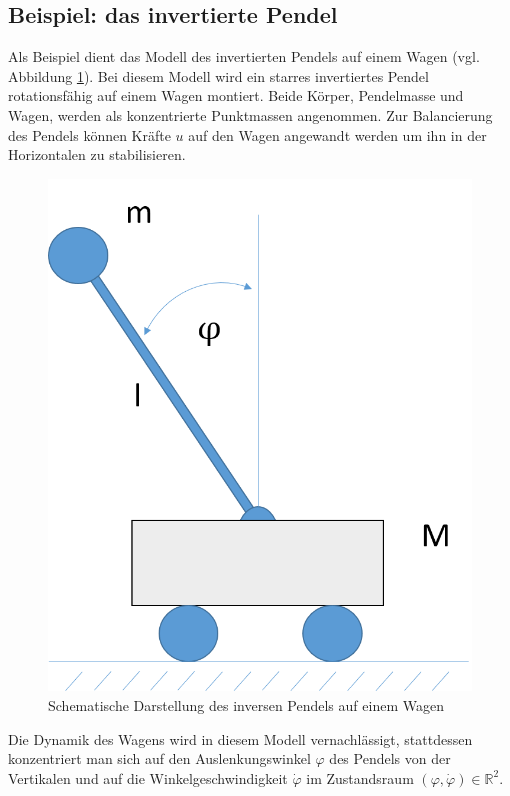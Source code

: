 \documentclass[12pt,a4paper,twoside]{article}
\begin{document}
	\subsection{Beispiel: das invertierte Pendel}
	
	Als Beispiel dient das Modell des invertierten Pendels auf einem Wagen (vgl. Abbildung \ref{pic:inv_pend}). Bei diesem Modell wird ein starres 
	invertiertes Pendel rotationsfähig auf einem Wagen montiert. Beide Körper, Pendelmasse und Wagen, werden als 
	konzentrierte Punktmassen angenommen. Zur Balancierung des Pendels können Kräfte $u$ auf den Wagen angewandt 
	werden um ihn in der Horizontalen zu stabilisieren.
	\begin{figure}[h]
	\center
		\includegraphics[scale=0.4]{inverted_pendulum}
		\caption{\label{pic:inv_pend}Schematische Darstellung des inversen Pendels auf einem Wagen}
	\end{figure}
	 Die Dynamik des Wagens wird in diesem Modell vernachlässigt, 
	stattdessen konzentriert man sich auf den Auslenkungswinkel $\varphi$ des Pendels von der Vertikalen und auf die 
	Winkelgeschwindigkeit $\dot{\varphi}$ im Zustandsraum $(\varphi,\dot{\varphi})\in \mathds{R}^2$. \\
\end{document}

